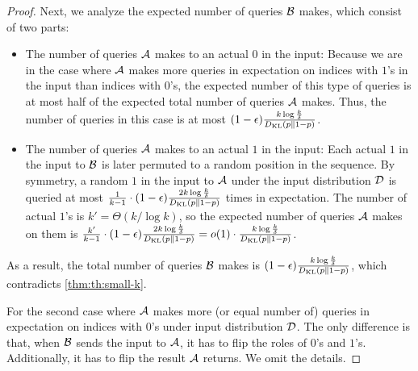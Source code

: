 \begin{proof}
Next, we analyze the expected number of queries $\mathcal{B}$ makes, which consist of two parts:
\begin{itemize}
  \item The number of queries $\mathcal{A}$ makes to an actual $0$ in the input: Because we are in the case where $\mathcal{A}$ makes more queries in expectation on indices with $1$'s in the input than indices with $0$'s, the expected number of this type of queries is at most half of the expected total number of queries $\mathcal{A}$ makes. Thus, the number of queries in this case is at most $(1-\epsilon)\frac{k \log \frac{k}{\delta}}{D_{\operatorname{\mathrm{KL}}}(p \parallel 1-p)}$.
  \item The number of queries $\mathcal{A}$ makes to an actual $1$ in the input: Each actual $1$ in the input to $\mathcal{B}$ is later permuted to a random position in the sequence. By symmetry, a random $1$ in the input to $\mathcal{A}$ under the input distribution $\mathcal{D}$ is queried at most $\frac{1}{k-1} \cdot (1-\epsilon)\frac{2k \log \frac{k}{\delta}}{D_{\operatorname{\mathrm{KL}}}(p \parallel 1-p)}$ times in expectation. The number of actual $1$'s is $k' = \Theta(k / \log k)$, so the expected number of queries $\mathcal{A}$ makes on them is $\frac{k'}{k-1} \cdot (1-\epsilon)\frac{2k \log \frac{k}{\delta}}{D_{\operatorname{\mathrm{KL}}}(p \parallel 1-p)} = o(1) \cdot \frac{k \log \frac{k}{\delta}}{D_{\operatorname{\mathrm{KL}}}(p \parallel 1-p)}$.
\end{itemize}
As a result, the total number of queries $\mathcal{B}$ makes is $(1-\epsilon)\frac{k \log \frac{k}{\delta}}{D_{\operatorname{\mathrm{KL}}}(p \parallel 1-p)}$, which contradicts \cref{thm:th:small-k}.


For the second case where $\mathcal{A}$ makes more (or equal number of) queries in expectation on indices with $0$'s under input distribution $\mathcal{D}$. The only difference is that, when $\mathcal{B}$ sends the input to $\mathcal{A}$, it has to flip the roles of $0$'s and $1$'s. Additionally, it has to flip the result $\mathcal{A}$ returns. We omit the details.
\end{proof}

